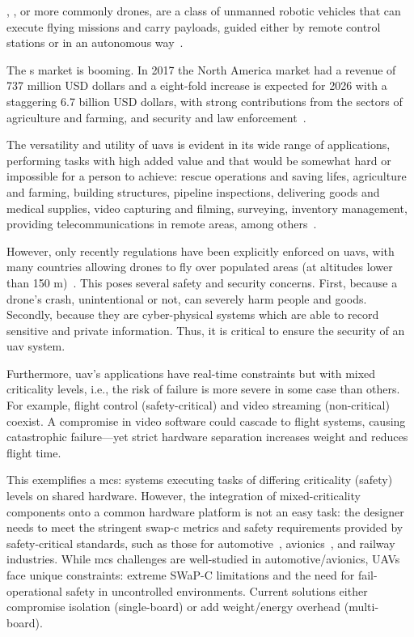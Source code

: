 
, , or more commonly drones, are a class of
unmanned robotic vehicles that can execute flying missions and carry payloads,
guided either by remote control stations or in an autonomous
way~\cite{alladi2022UAVBlockain,glossner2021overview}.

The s market is booming. In 2017 the North America market had a revenue of
737 million USD dollars and a eight-fold increase is expected for 2026 with a
staggering 6.7 billion USD dollars, with strong contributions from the sectors
of agriculture and farming, and security and law
enforcement~\cite{mohsan2022towards}.

The versatility and utility of \glspl{uav} is evident in its wide
range of applications, performing tasks with high added value and that would be
somewhat hard or impossible for a person to achieve: rescue operations and
saving lifes, agriculture and farming, building structures, pipeline
inspections, delivering goods and medical supplies, video capturing and filming,
surveying, inventory management, providing telecommunications in remote areas,
among others~\cite{alladi2022UAVBlockain}.

However, only recently regulations have been explicitly enforced on \glspl{uav},
with many countries allowing drones to fly over populated areas (at altitudes
lower than 150 m)~\cite{nassi2021sok}. This poses several safety and security
concerns. First, because a drone's crash, unintentional or not, can severely
harm people and goods. Secondly, because they are cyber-physical systems which
are able to record sensitive and private information. Thus,
it is critical to ensure the security of an \gls{uav} system.

Furthermore, \gls{uav}'s applications have real-time constraints but with mixed
criticality levels, i.e., the risk of failure is more severe in some case than others.
For example, flight control (safety-critical) and video streaming (non-critical)
coexist. A compromise in video software could cascade to flight systems, causing
catastrophic failure—yet strict hardware separation increases weight and reduces
flight time.

This exemplifies a \gls{mcs}: systems executing tasks of differing criticality (safety) levels on shared hardware.
However, the integration of mixed-criticality components onto a common hardware
platform is not an easy task: the designer needs to meet the stringent
\gls{swap-c} metrics and safety requirements
provided by safety-critical standards, such as those for automotive~\cite{iso26262}, avionics~\cite{johnson1998sw},
and railway~\cite{cenelec201250128} industries.
While \gls{mcs} challenges are well-studied in automotive/avionics, UAVs face unique
constraints: extreme SWaP-C limitations and the need for fail-operational safety
in uncontrolled environments. Current solutions either compromise isolation
(single-board) or add weight/energy overhead (multi-board).

